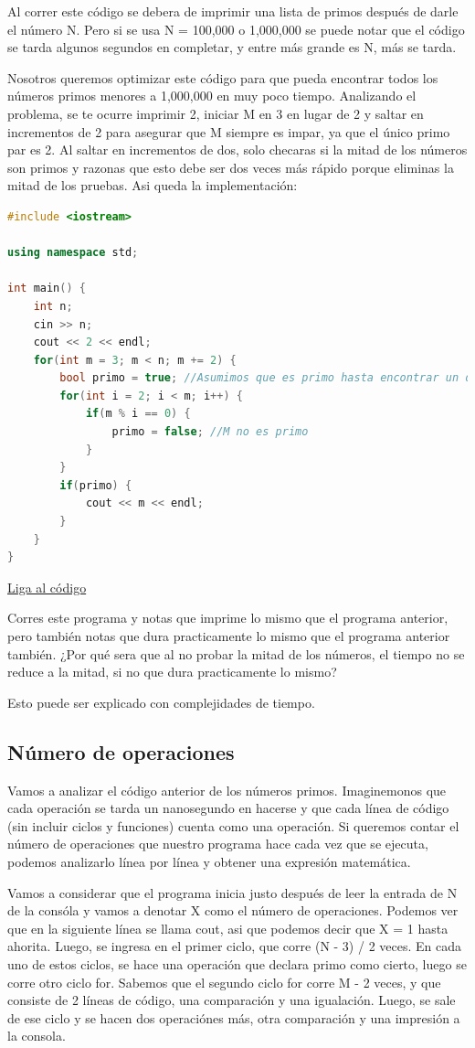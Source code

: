 \documentclass{article}
\begin{document}
Al correr este código se debera de imprimir una lista de primos después de darle el número N. Pero si se usa N = 100,000 o 1,000,000 se puede notar que el código se tarda algunos segundos en completar, y entre más grande es N, más se tarda.

Nosotros queremos optimizar este código para que pueda encontrar todos los números primos menores a 1,000,000 en muy poco tiempo. Analizando el problema, se te ocurre imprimir 2, iniciar M en 3 en lugar de 2 y saltar en incrementos de 2 para asegurar que M siempre es impar, ya que el único primo par es 2. Al saltar en incrementos de dos, solo checaras si la mitad de los números son primos y razonas que esto debe ser dos veces más rápido porque eliminas la mitad de los pruebas. Asi queda la implementación:

\begin{lstlisting}[language=C++, title=¿Optimizando?]
#include <iostream>

using namespace std;

int main() {
	int n;
	cin >> n;
	cout << 2 << endl;
	for(int m = 3; m < n; m += 2) {
		bool primo = true; //Asumimos que es primo hasta encontrar un divisor
		for(int i = 2; i < m; i++) {
			if(m % i == 0) {
				primo = false; //M no es primo
			}
		}
		if(primo) {
			cout << m << endl;
		}
	}
}
\end{lstlisting}
\href{https://repl.it/@Jamesscn/Programa-ineficiente}{Liga al código}

Corres este programa y notas que imprime lo mismo que el programa anterior, pero también notas que dura practicamente lo mismo que el programa anterior también. ¿Por qué sera que al no probar la mitad de los números, el tiempo no se reduce a la mitad, si no que dura practicamente lo mismo?

Esto puede ser explicado con complejidades de tiempo.

\subsection{Número de operaciones}

Vamos a analizar el código anterior de los números primos. Imaginemonos que cada operación se tarda un nanosegundo en hacerse y que cada línea de código (sin incluir ciclos y funciones) cuenta como una operación. Si queremos contar el número de operaciones que nuestro programa hace cada vez que se ejecuta, podemos analizarlo línea por línea y obtener una expresión matemática.

Vamos a considerar que el programa inicia justo después de leer la entrada de N de la consóla y vamos a denotar X como el número de operaciones. Podemos ver que en la siguiente línea se llama cout, asi que podemos decir que X = 1 hasta ahorita. Luego, se ingresa en el primer ciclo, que corre (N - 3) / 2 veces. En cada uno de estos ciclos, se hace una operación que declara primo como cierto, luego se corre otro ciclo for. Sabemos que el segundo ciclo for corre M - 2 veces, y que consiste de 2 líneas de código, una comparación y una igualación. Luego, se sale de ese ciclo y se hacen dos operaciónes más, otra comparación y una impresión a la consola.
\end{document}
